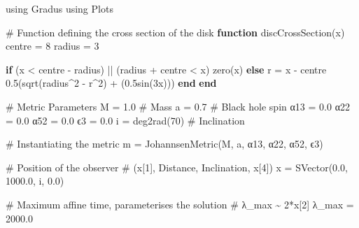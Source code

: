 \documentclass[
  letterpaper,
  DIV=11,
  numbers=noendperiod]{scrreprt}
\newenvironment{Shaded}{\begin{snugshade}}{\end{snugshade}}
\newcommand{\BuiltInTok}[1]{\textcolor[rgb]{0.00,0.23,0.31}{#1}}
\newcommand{\CommentTok}[1]{\textcolor[rgb]{0.37,0.37,0.37}{#1}}
\newcommand{\ControlFlowTok}[1]{\textcolor[rgb]{0.00,0.23,0.31}{\textbf{#1}}}
\newcommand{\FloatTok}[1]{\textcolor[rgb]{0.68,0.00,0.00}{#1}}
\newcommand{\FunctionTok}[1]{\textcolor[rgb]{0.28,0.35,0.67}{#1}}
\newcommand{\ImportTok}[1]{\textcolor[rgb]{0.00,0.46,0.62}{#1}}
\newcommand{\KeywordTok}[1]{\textcolor[rgb]{0.00,0.23,0.31}{\textbf{#1}}}
\newcommand{\NormalTok}[1]{\textcolor[rgb]{0.00,0.23,0.31}{#1}}
\newcommand{\OperatorTok}[1]{\textcolor[rgb]{0.37,0.37,0.37}{#1}}
\begin{document}
\begin{Shaded}
\begin{Highlighting}[]
\ImportTok{using} \BuiltInTok{Gradus}
\ImportTok{using} \BuiltInTok{Plots}

\CommentTok{\# Function defining the cross section of the disk}
\KeywordTok{function} \FunctionTok{discCrossSection}\NormalTok{(x)}
\NormalTok{    centre }\OperatorTok{=} \FloatTok{8}
\NormalTok{    radius }\OperatorTok{=} \FloatTok{3}

    \ControlFlowTok{if}\NormalTok{ (x }\OperatorTok{\textless{}}\NormalTok{ centre }\OperatorTok{{-}}\NormalTok{ radius) }\OperatorTok{||}\NormalTok{ (radius }\OperatorTok{+}\NormalTok{ centre }\OperatorTok{\textless{}}\NormalTok{ x)}
        \FunctionTok{zero}\NormalTok{(x)}
    \ControlFlowTok{else} 
\NormalTok{        r }\OperatorTok{=}\NormalTok{ x }\OperatorTok{{-}}\NormalTok{ centre}
        \FloatTok{0.5}\NormalTok{(}\FunctionTok{sqrt}\NormalTok{(radius}\OperatorTok{\^{}}\FloatTok{2} \OperatorTok{{-}}\NormalTok{ r}\OperatorTok{\^{}}\FloatTok{2}\NormalTok{) }\OperatorTok{+}\NormalTok{ (}\FloatTok{0.5}\FunctionTok{sin}\NormalTok{(}\FloatTok{3}\NormalTok{x)))}
    \ControlFlowTok{end}
\KeywordTok{end}

\CommentTok{\# Metric Parameters}
\NormalTok{M }\OperatorTok{=} \FloatTok{1.0}     \CommentTok{\# Mass}
\NormalTok{a }\OperatorTok{=} \FloatTok{0.7}     \CommentTok{\# Black hole spin}
\NormalTok{α}\FloatTok{13} \OperatorTok{=} \FloatTok{0.0}   
\NormalTok{α}\FloatTok{22} \OperatorTok{=} \FloatTok{0.0}
\NormalTok{α}\FloatTok{52} \OperatorTok{=} \FloatTok{0.0}
\NormalTok{ϵ}\FloatTok{3} \OperatorTok{=} \FloatTok{0.0}
\NormalTok{i }\OperatorTok{=} \FunctionTok{deg2rad}\NormalTok{(}\FloatTok{70}\NormalTok{) }\CommentTok{\# Inclination}

\CommentTok{\# Instantiating the metric}
\NormalTok{m }\OperatorTok{=} \FunctionTok{JohannsenMetric}\NormalTok{(M, a, α}\FloatTok{13}\NormalTok{, α}\FloatTok{22}\NormalTok{, α}\FloatTok{52}\NormalTok{, ϵ}\FloatTok{3}\NormalTok{)}

\CommentTok{\# Position of the observer}
\CommentTok{\# (x[1], Distance, Inclination, x[4])}
\NormalTok{x }\OperatorTok{=} \FunctionTok{SVector}\NormalTok{(}\FloatTok{0.0}\NormalTok{, }\FloatTok{1000.0}\NormalTok{, i, }\FloatTok{0.0}\NormalTok{)}

\CommentTok{\# Maximum affine time, parameterises the solution}
\CommentTok{\# λ\_max \textasciitilde{} 2*x[2]}
\NormalTok{λ\_max }\OperatorTok{=} \FloatTok{2000.0}


\end{Highlighting}
\end{Shaded}
\end{document}
